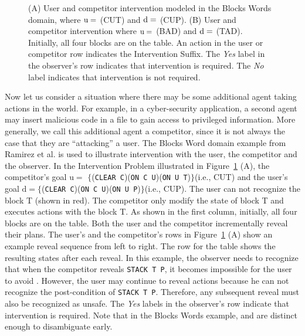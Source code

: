 \begin{figure}[tpb]
   \caption{(A) User and competitor intervention modeled in the Blocks Words domain, where $\mathrm{u}=$ (CUT) and $\mathrm{d}=$ (CUP). (B) User and competitor intervention where $\mathrm{u}= $ (BAD) and $\mathrm{d}= $ (TAD). \\ Initially, all four blocks are on the table. An action in the user or competitor row indicates the Intervention Suffix. The \textit{Yes} label in the observer's row indicates that intervention is required. The \textit{No} label indicates that intervention is not required.}
\label{fig:bw2}
\end{figure}

Now let us consider a situation where there may be some additional agent taking actions in the world.
For example, in a cyber-security application, a second agent may insert malicious code in a file to gain access to privileged information.
More generally, we call this additional agent a competitor, since it is not always the case that they are ``attacking'' a user.
The Blocks Word domain example from Ramirez et al. \citeyear{ramirez2009plan} is used to illustrate intervention with the user, the competitor and the observer. 
In the Intervention Problem illustrated in Figure~\ref{fig:bw2} (A), the competitor's goal $\mathrm{u}=$ $\lbrace$(\texttt{CLEAR C})(\texttt{ON C U})(\texttt{ON U T})$\rbrace$(i.e., CUT) and the user's goal $\mathrm{d}=\lbrace$(\texttt{CLEAR C})(\texttt{ON C U})(\texttt{ON U P})$\rbrace$(i.e., CUP). The user can not recognize the block T (shown in red). The competitor only modify the state of block T and executes actions with the block T. As shown in the first column, initially, all four blocks are on the table. 
Both the user and the competitor incrementally reveal their plans.
The user's and the competitor's rows in Figure~\ref{fig:bw2} (A) show an example reveal sequence from left to right. 
The row for the table shows the resulting states after each reveal.
In this example, the observer needs to recognize that when the competitor reveals \texttt{STACK T P}, it becomes impossible for the user to avoid \undesired. 
However, the user may continue to reveal actions because he can not recognize the post-condition of \texttt{STACK T P}. 
Therefore, any subsequent reveal must also be recognized as unsafe.
The \textit{Yes} labels in the observer's row indicate that intervention is required. 
Note that in the Blocks Words example, \desired and \undesired are distinct enough to disambiguate early.

